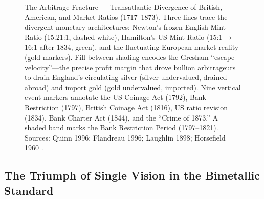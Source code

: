 \documentclass[
]{article}
\makeatletter
\newcommand*\pandocbounded[1]{%
  \sbox\pandoc@box{#1}%
  \Gscale@div\@tempa{\textheight}{\dimexpr\ht\pandoc@box+\dp\pandoc@box\relax}%
  \Gscale@div\@tempb{\linewidth}{\wd\pandoc@box}%
  \ifdim\@tempb\p@<\@tempa\p@\let\@tempa\@tempb\fi%
  \ifdim\@tempa\p@<\p@\scalebox{\@tempa}{\usebox\pandoc@box}%
  \else\usebox{\pandoc@box}%
  \fi%
}
\makeatother
\begin{document}
\begin{figure}
\centering
\pandocbounded{\includegraphics[keepaspectratio,alt={The Arbitrage Fracture --- Transatlantic Divergence of British, American, and Market Ratios (1717--1873). Three lines trace the divergent monetary architectures: Newton's frozen English Mint Ratio (15.21:1, dashed white), Hamilton's US Mint Ratio (15:1 → 16:1 after 1834, green), and the fluctuating European market reality (gold markers). Fill-between shading encodes the Gresham ``escape velocity''---the precise profit margin that drove bullion arbitrageurs to drain England's circulating silver (silver undervalued, drained abroad) and import gold (gold undervalued, imported). Nine vertical event markers annotate the US Coinage Act (1792), Bank Restriction (1797), British Coinage Act (1816), US ratio revision (1834), Bank Charter Act (1844), and the ``Crime of 1873.'' A shaded band marks the Bank Restriction Period (1797--1821). Sources: Quinn 1996; Flandreau 1996; Laughlin 1898; Horsefield 1960 {[}@flandreau1996bimetallism; @laughlin1898bimetallism{]}.}]{../figures/historic_ratio_dark.pdf}}
\caption{The Arbitrage Fracture --- Transatlantic Divergence of British,
American, and Market Ratios (1717--1873). Three lines trace the
divergent monetary architectures: Newton's frozen English Mint Ratio
(15.21:1, dashed white), Hamilton's US Mint Ratio (15:1 → 16:1 after
1834, green), and the fluctuating European market reality (gold
markers). Fill-between shading encodes the Gresham ``escape
velocity''---the precise profit margin that drove bullion arbitrageurs
to drain England's circulating silver (silver undervalued, drained
abroad) and import gold (gold undervalued, imported). Nine vertical
event markers annotate the US Coinage Act (1792), Bank Restriction
(1797), British Coinage Act (1816), US ratio revision (1834), Bank
Charter Act (1844), and the ``Crime of 1873.'' A shaded band marks the
Bank Restriction Period (1797--1821). Sources: Quinn 1996; Flandreau
1996; Laughlin 1898; Horsefield 1960
\citep{flandreau1996bimetallism, laughlin1898bimetallism}.}\label{fig-historic-ratio}
\end{figure}

\subsection{The Triumph of Single Vision in the Bimetallic
Standard}\label{the-triumph-of-single-vision-in-the-bimetallic-standard}
\end{document}
